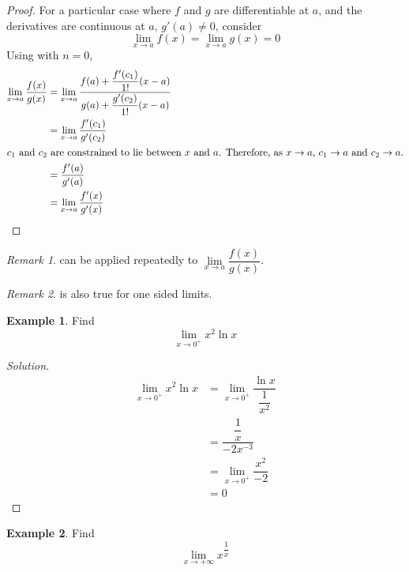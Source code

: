 \documentclass[fleqn]{article}
\theoremstyle{definition}
\newtheorem{example}{Example}
\theoremstyle{theorem}
\theoremstyle{remark}
\newtheorem{remark}{Remark}
\newenvironment{solution}
{\begin{proof}[Solution]\let\qed\relax}
	{\end{proof}}
\begin{document}
\begin{proof}
	For a particular case where $f$ and $g$ are differentiable at $a$, and the derivatives are continuous at $a$, $g'(a) \neq 0$, consider 
	\begin{equation*}
		\lim\limits_{x \to a} f(x) = \lim\limits_{x \to a} g(x) = 0
	\end{equation*}
	Using  with $n = 0$,
	\begin{align*}
		\lim\limits_{x \to a} \dfrac{f(x)}{g(x)} &= \lim\limits_{x \to a} \dfrac{f(a) + \dfrac{f'(c_1)}{1!} (x-a)}{g(a) + \dfrac{g'(c_2)}{1!} (x-a)} \\
		&= \lim\limits_{x \to a} \dfrac{f'(c_1)}{g'(c_2)} \\
		\intertext{$c_1$ and $c_2$ are constrained to lie between $x$ and $a$. Therefore, as $x \to a$, $c_1 \to a$ and $c_2 \to a$.}
		&= \dfrac{f'(a)}{g'(a)} \\
		&= \lim\limits_{x \to a}\dfrac{f'(x)}{g'(x)}
	\end{align*}
\end{proof}

\begin{remark}
	 can be applied repeatedly to $\lim\limits_{x \to a} \dfrac{f(x)}{g(x)}$.
\end{remark}

\begin{remark}
	 is also true for one sided limits.
\end{remark}

\begin{example}
	Find
	\begin{equation*}
	\lim\limits_{x \to 0^+} x^2 \ln x
	\end{equation*}
\end{example}

\begin{solution}
	\begin{align*}
		\lim\limits_{x \to 0^+} x^2 \ln x &= \lim\limits_{x \to 0^+} \dfrac{\ln x}{\dfrac{1}{x^2}} \\
		&= \dfrac{\dfrac{1}{x}}{-2 x^{-3}} \\
		&= \lim\limits_{x \to 0^+} \dfrac{x^2}{-2} \\
		&= 0
	\end{align*}
\end{solution}

\begin{example}
	Find
	\begin{equation*}
		\lim\limits_{x \to +\infty} x^{\dfrac{1}{x}}
	\end{equation*}
\end{example}
\end{document}
